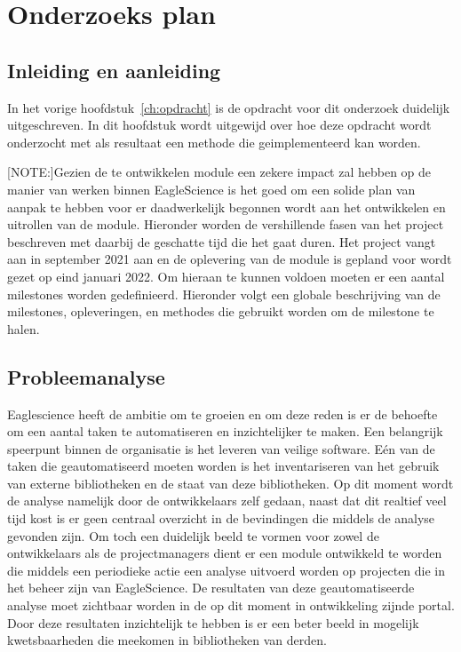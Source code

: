 \usepackage{graphicx}


\chapter{Onderzoeks plan}\label{ch:onderzoekPlan}


\section{Inleiding en aanleiding}\label{sec:inleiding-en-aanleiding}%
In het vorige hoofdstuk~\ref{ch:opdracht} is de opdracht voor dit onderzoek duidelijk uitgeschreven. In dit hoofdstuk wordt uitgewijd over hoe deze opdracht wordt onderzocht met als resultaat een methode die geimplementeerd kan worden.

[NOTE:]Gezien de te ontwikkelen module een zekere impact zal hebben op de manier van werken binnen EagleScience is het goed om een solide plan van aanpak te hebben voor er daadwerkelijk begonnen wordt aan het ontwikkelen en uitrollen van de module. Hieronder worden de vershillende fasen van het project beschreven met daarbij de geschatte tijd die het gaat duren. Het project vangt aan in september 2021 aan en de oplevering van de module is gepland voor wordt gezet op eind januari 2022. Om hieraan te kunnen voldoen moeten er een aantal milestones worden gedefinieerd. Hieronder volgt een globale beschrijving van de milestones, opleveringen, en methodes die gebruikt worden om de milestone te halen.


\section{Probleemanalyse}\label{sec:probleemanalyse}
Eaglescience heeft de ambitie om te groeien en om deze reden is er de behoefte om een aantal taken te automatiseren en inzichtelijker te maken. Een belangrijk speerpunt binnen de organisatie is het leveren van veilige software. Eén van de taken die geautomatiseerd moeten worden is het inventariseren van het gebruik van externe bibliotheken en de staat van deze bibliotheken. Op dit moment wordt de analyse namelijk door de ontwikkelaars zelf gedaan, naast dat dit realtief veel tijd kost is er geen centraal overzicht in de bevindingen die middels de analyse gevonden zijn. Om toch een duidelijk beeld te vormen voor zowel de ontwikkelaars als de projectmanagers dient er een module ontwikkeld te worden die middels een periodieke actie een analyse uitvoerd worden op projecten die in het beheer zijn van EagleScience. De resultaten van deze geautomatiseerde analyse moet zichtbaar worden in de op dit moment in ontwikkeling zijnde portal. Door deze resultaten inzichtelijk te hebben is er een beter beeld in mogelijk kwetsbaarheden die meekomen in bibliotheken van derden.

